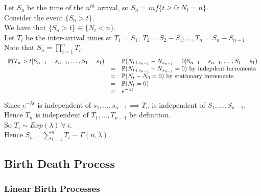 \documentclass[11pt,a4paper]{article}
\begin{document}
Let $S_n$ be the time of the $n^{th}$ arrival, so $S_n=inf\{t\geq0:N_t=n\}$.\\
Consider the event $\{S_n>t\}$.\\
We have that $\{S_n>t\}\equiv\{N_t<n\}$.\\
Let $T_i$ be the inter-arrival times st $T_1=S_1,\ T_2=S_2-S_1,\dots,T_n=S_n-S_{n-1}$.\\
Note that $S_n=\prod_{i=1}^nT_i$.
\[\begin{array}{rcll}
\prob(T_n>t|S_{n-1}=s_{n-1},\dots,S_1=s_1)&=&\prob(N_{t+s_{n-1}}-N_{s_{n-1}}=0|S_{n-1}=s_{n-1},\dots,S_1=s_1)\\
&=&\prob(N_{t+s_{n-1}}-N_{s_{n-1}}=0)\mathrm{\ by\ indepdent\ increments}\\
&=&\prob(N_t-N_0=0)\mathrm{\ by\ stationary\ increments}\\
&=&\prob(N_t=0)\\
&=&e^{-\lambda t}
\end{array}\]
Since $e^{-\lambda t}$ is independent of $s_1,\dots,s_{n-1}\implies T_n$ is independent of $S_1,\dots,S_{n-1}$.\\
Hence $T_n$ is independent of $T_1,\dots,T_{n-1}$ be definition.\\
So $T_i\sim Exp(\lambda)\ \forall\ i$.\\
Hence $S_n=\sum_{i=1}^nT_i\sim\Gamma(n,\lambda)$.

\subsection{Birth Death Process}

\subsubsection{Linear Birth Processes}
\end{document}
